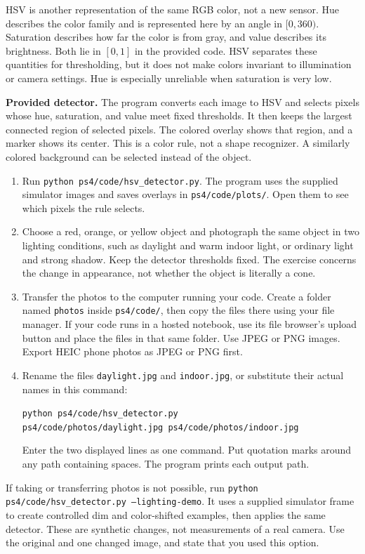 \documentclass[11pt]{article}
\begin{document}
HSV is another representation of the same RGB color, not a new sensor.
Hue describes the color family and is represented here by an angle in
$[0,360)$. Saturation describes how far the color is from gray, and value
describes its brightness. Both lie in $[0,1]$ in the provided code.
HSV separates these quantities for thresholding, but it does not make
colors invariant to illumination or camera settings. Hue is especially
unreliable when saturation is very low.

\textbf{Provided detector.} The program converts each image to HSV and
selects pixels whose hue, saturation, and value meet fixed thresholds.
It then keeps the largest connected region of selected pixels.
The colored overlay shows that region, and a marker shows its center.
This is a color rule, not a shape recognizer. A similarly colored
background can be selected instead of the object.

\begin{enumerate}
\item Run \texttt{python ps4/code/hsv\_detector.py}.
The program uses the supplied simulator images and saves overlays in
\texttt{ps4/code/plots/}. Open them to see which pixels the rule selects.
\item Choose a red, orange, or yellow object and photograph the same
object in two lighting conditions, such as daylight and warm indoor
light, or ordinary light and strong shadow. Keep the detector thresholds
fixed. The exercise concerns the change in appearance, not whether the
object is literally a cone.
\item Transfer the photos to the computer running your code.
Create a folder named \texttt{photos} inside \texttt{ps4/code/}, then
copy the files there using your file manager. If your code runs in a
hosted notebook, use its file browser's upload button and place the
files in that same folder. Use JPEG or PNG images. Export HEIC phone
photos as JPEG or PNG first.
\item Rename the files \texttt{daylight.jpg} and \texttt{indoor.jpg},
or substitute their actual names in this command:
\begin{center}
\texttt{python ps4/code/hsv\_detector.py}\\
\texttt{ps4/code/photos/daylight.jpg ps4/code/photos/indoor.jpg}
\end{center}
Enter the two displayed lines as one command. Put quotation marks
around any path containing spaces. The program prints each output path.
\end{enumerate}
If taking or transferring photos is not possible, run
\texttt{python ps4/code/hsv\_detector.py --lighting-demo}.
It uses a supplied simulator frame to create controlled dim and
color-shifted examples, then applies the same detector. These are
synthetic changes, not measurements of a real camera.
Use the original and one changed image, and state that you used this option.
\end{document}
